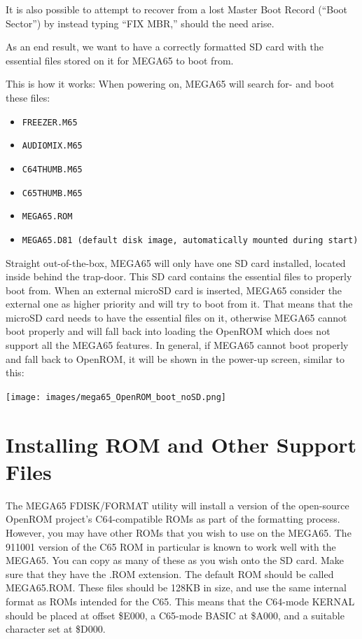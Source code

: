 It is also possible to attempt to recover from a lost Master Boot
Record (``Boot Sector'') by instead typing ``FIX MBR,'' should the
need arise.


As an end result, we want to have a correctly formatted SD card with the essential files stored on it for MEGA65 to boot from.

This is how it works: When powering on, MEGA65 will search for- and boot these files:
\begin{itemize}
\item {\tt FREEZER.M65}
\item {\tt AUDIOMIX.M65}
\item {\tt C64THUMB.M65}
\item {\tt C65THUMB.M65}
\item {\tt MEGA65.ROM}
\item {\tt MEGA65.D81 (default disk image, automatically mounted during start)}
\end{itemize}

Straight out-of-the-box, MEGA65 will only have one SD card installed, located inside behind the trap-door. This SD card contains the essential files to properly boot from.
When an external microSD card is inserted, MEGA65 consider the external one as higher priority and will try to boot from it.
That means that the microSD card needs to have the essential files on it, otherwise MEGA65 cannot boot properly and will fall back into loading the OpenROM which does not support all the MEGA65 features.
In general, if MEGA65 cannot boot properly and fall back to OpenROM, it will be shown in the power-up screen, similar to this:

\texttt{[image: images/mega65\_OpenROM\_boot\_noSD.png]}


\section{Installing ROM and Other Support Files}
\label{sec:installingrometc}

The MEGA65 FDISK/FORMAT utility will install a version of the
open-source OpenROM project's C64-compatible ROMs as part of the
formatting process. However, you may have other ROMs that you wish to
use on the MEGA65. The 911001 version of the C65 ROM in
particular is known to work well with the MEGA65.
You can copy as many of these as you wish onto the
SD card.  Make sure that they have the .ROM extension.  The default ROM
should be called MEGA65.ROM.  These files
should be 128KB in size, and use the same internal format as ROMs
intended for the C65.  This means that the C64-mode KERNAL should be
placed at offset \$E000, a C65-mode BASIC at \$A000, and a suitable
character set at \$D000.  

